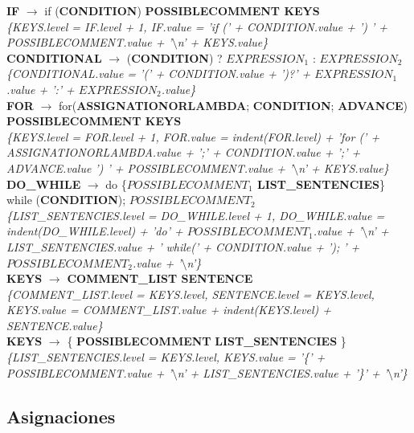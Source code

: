 \documentclass[10pt,a4paper]{article}
\begin{document}
\textbf{IF} $\rightarrow$ if (\textbf{CONDITION}) \textbf{POSSIBLECOMMENT KEYS} \\
\textit{\{KEYS.level = IF.level + 1, IF.value = 'if (' + CONDITION.value + ') ' + POSSIBLECOMMENT.value + '$\setminus$n' + KEYS.value\}} \\

\textbf{CONDITIONAL} $\rightarrow$ (\textbf{CONDITION}) ? \textbf{$EXPRESSION_{1}$} : \textbf{$EXPRESSION_{2}$}  \\
\textit{\{CONDITIONAL.value = '(' + CONDITION.value + ')?' + $EXPRESSION_{1}$.value + ':' + $EXPRESSION_{2}$.value\}}\\
	
\textbf{FOR} $\rightarrow$ for(\textbf{ASSIGNATIONORLAMBDA}; \textbf{CONDITION}; \textbf{ADVANCE}) \textbf{POSSIBLECOMMENT KEYS}  \\
\textit{\{KEYS.level = FOR.level + 1, FOR.value = indent(FOR.level) + 'for (' + ASSIGNATIONORLAMBDA.value + ';' + CONDITION.value + ';' + ADVANCE.value ') ' + POSSIBLECOMMENT.value + '$\setminus$n' + KEYS.value\}}\\

\textbf{DO\_WHILE} $\rightarrow$ do \{\textbf{$POSSIBLECOMMENT_{1}$ LIST\_SENTENCIES}\} while (\textbf{CONDITION}); \textbf{$POSSIBLECOMMENT_{2}$} \\
\textit{\{LIST\_SENTENCIES.level = DO\_WHILE.level + 1, DO\_WHILE.value = indent(DO\_WHILE.level) + 'do{' + $POSSIBLECOMMENT_{1}$.value + '$\setminus$n' + LIST\_SENTENCIES.value + '} while(' + CONDITION.value + '); ' + $POSSIBLECOMMENT_{2}$.value + '$\setminus$n'\}}\\

\textbf{KEYS} $\rightarrow$ \textbf{COMMENT\_LIST SENTENCE} \\ 
\textit{\{COMMENT\_LIST.level = KEYS.level, SENTENCE.level = KEYS.level, KEYS.value = COMMENT\_LIST.value + indent(KEYS.level) + SENTENCE.value\}} \\

\textbf{KEYS} $\rightarrow$ \{ \textbf{POSSIBLECOMMENT} \textbf{LIST\_SENTENCIES} \} \\
\textit{\{LIST\_SENTENCIES.level = KEYS.level, KEYS.value = '\{' + POSSIBLECOMMENT.value + '$\setminus$n' + LIST\_SENTENCIES.value + '\}' + '$\setminus$n'\}} \\

\subsection{Asignaciones}
\end{document}
